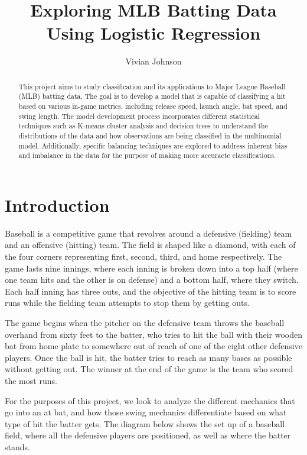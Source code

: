 \documentclass[
  letterpaper,
  DIV=11,
  numbers=noendperiod]{scrartcl}
\title{Exploring MLB Batting Data Using Logistic Regression}
\author{Vivian Johnson}
\date{}
\begin{document}
\maketitle
\begin{abstract}
This project aims to study classification and its applications to Major
League Baseball (MLB) batting data. The goal is to develop a model that
is capable of classifying a hit based on various in-game metrics,
including release speed, launch angle, bat speed, and swing length. The
model development process incorporates different statistical techniques
such as K-means cluster analysis and decision trees to understand the
distributions of the data and how observations are being classified in
the multinomial model. Additionally, specific balancing techniques are
explored to address inherent bias and imbalance in the data for the
purpose of making more accuracte classifications.
\end{abstract}

\newpage

\setcounter{tocdepth}{4}
\tableofcontents

\newpage

\section{Introduction}\label{introduction}

Baseball is a competitive game that revolves around a defensive
(fielding) team and an offensive (hitting) team. The field is shaped
like a diamond, with each of the four corners representing first,
second, third, and home respectively. The game lasts nine innings, where
each inning is broken down into a top half (where one team hits and the
other is on defense) and a bottom half, where they switch. Each half
inning has three outs, and the objective of the hitting team is to score
runs while the fielding team attempts to stop them by getting outs.

The game begins when the pitcher on the defensive team throws the
baseball overhand from sixty feet to the batter, who tries to hit the
ball with their wooden bat from home plate to somewhere out of reach of
one of the eight other defensive players. Once the ball is hit, the
batter tries to reach as many bases as possible without getting out. The
winner at the end of the game is the team who scored the most runs.

For the purposes of this project, we look to analyze the different
mechanics that go into an at bat, and how those swing mechanics
differentiate based on what type of hit the batter gets. The diagram
below shows the set up of a baseball field, where all the defensive
players are positioned, as well as where the batter stands.
\end{document}
